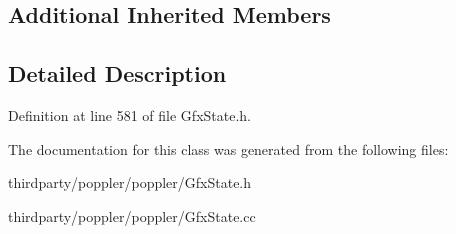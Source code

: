 \subsection*{Additional Inherited Members}


\subsection{Detailed Description}


Definition at line 581 of file Gfx\+State.\+h.



The documentation for this class was generated from the following files\+:\begin{DoxyCompactItemize}
\item 
thirdparty/poppler/poppler/Gfx\+State.\+h\item 
thirdparty/poppler/poppler/Gfx\+State.\+cc\end{DoxyCompactItemize}
